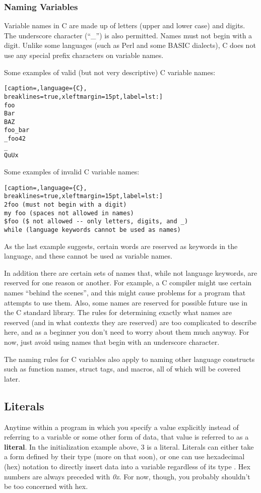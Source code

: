 \subsubsection{Naming Variables}
Variable names in C are made up of letters (upper and lower case) and digits.
The underscore character (``\_'') is also permitted. Names must not begin with
a digit. Unlike some languages (such as Perl and some BASIC dialects), C does
not use any special prefix characters on variable names.

Some examples of valid (but not very descriptive) C variable names:
\lstset{basicstyle=\scriptsize, numbers=left, captionpos=b, tabsize=4}
\begin{lstlisting}[caption=,language={C},
breaklines=true,xleftmargin=15pt,label=lst:]
foo
Bar
BAZ
foo_bar
_foo42
_
QuUx
\end{lstlisting}

Some examples of invalid C variable names:
\lstset{basicstyle=\scriptsize, numbers=left, captionpos=b, tabsize=4}
\begin{lstlisting}[caption=,language={C},
breaklines=true,xleftmargin=15pt,label=lst:]
2foo (must not begin with a digit)
my foo (spaces not allowed in names)
$foo ($ not allowed -- only letters, digits, and _)
while (language keywords cannot be used as names)
\end{lstlisting}

As the last example suggests, certain words are reserved as keywords in the
language, and these cannot be used as variable names.

In addition there are certain sets of names that, while not language keywords,
are reserved for one reason or another. For example, a C compiler might use
certain names ``behind the scenes'', and this might cause problems for a
program that attempts to use them. Also, some names are reserved for possible
future use in the C standard library. The rules for determining exactly what
names are reserved (and in what contexts they are reserved) are too complicated
to describe here, and as a beginner you don't need to worry about them much
anyway. For now, just avoid using names that begin with an underscore
character.

The naming rules for C variables also apply to naming other language constructs
such as function names, struct tags, and macros, all of which will be covered
later.

\subsection{Literals}
Anytime within a program in which you specify a value explicitly instead of
referring to a variable or some other form of data, that value is referred to
as a \textbf{literal}. In the initialization example above, 3 is a literal.
Literals can either take a form defined by their type (more on that soon), or
one can use hexadecimal (hex) notation to directly insert data into a variable
regardless of its type
. Hex numbers are always preceded with \emph{0x}. For now, though, you probably
shouldn't be too concerned with hex.

